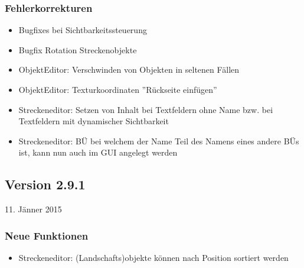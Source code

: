 \subsubsection{Fehlerkorrekturen}
\begin{itemize}
\item Bugfixes bei Sichtbarkeitssteuerung
\item Bugfix Rotation Streckenobjekte

\item ObjektEditor: Verschwinden von Objekten in seltenen Fällen
\item ObjektEditor: Texturkoordinaten ''Rückseite einfügen''

\item Streckeneditor: Setzen von Inhalt bei Textfeldern ohne Name bzw. bei Textfeldern mit dynamischer Sichtbarkeit
\item Streckeneditor: BÜ bei welchem der Name Teil des Namens eines andere BÜs ist, kann nun auch im GUI angelegt werden
\end{itemize}

\subsection{Version 2.9.1}\hfill 11. Jänner 2015

\subsubsection{Neue Funktionen}
\begin{itemize}
\item Streckeneditor: (Landschafts)objekte können nach Position sortiert werden
\end{itemize}

